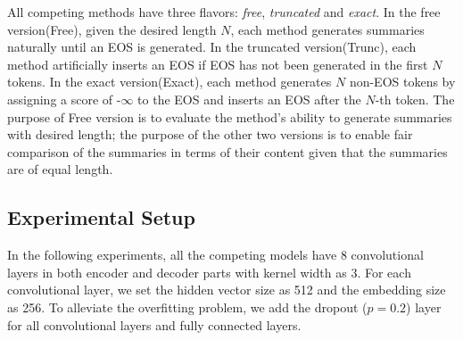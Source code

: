 All competing methods
have three flavors: {\em free}, {\em truncated} and {\em exact}.
In the free version(Free), given the desired length $N$,
each method generates summaries naturally until
an EOS is generated. 
In the truncated version(Trunc), each method artificially
inserts an EOS if EOS has not been generated in the first $N$ tokens.
In the exact version(Exact), each method
generates $N$ non-EOS tokens by assigning a score
of -$\infty$ to the EOS and inserts an EOS after the $N$-th token.
The purpose of Free version is to evaluate the method's ability to
generate summaries with desired length; the purpose of the other
two versions is to enable fair comparison of the summaries in terms of
their content given that the summaries are of equal length. 





\subsection{Experimental Setup}
In the following experiments, 
all the competing models have 8 convolutional layers in
both encoder and decoder parts with kernel width as 3.
For each convolutional layer, 
we set the hidden vector size as 512 and the embedding size as 256.
To alleviate the overfitting problem,
we add the dropout ($p=0.2$) layer for 
all convolutional layers and fully connected layers.

